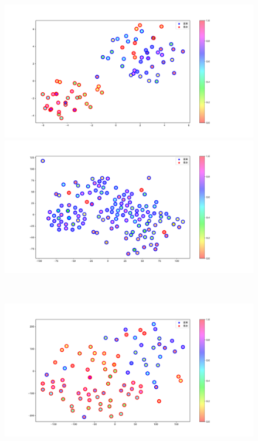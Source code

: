\begin{figure}[h]
 \begin{minipage}[b]{0.48\linewidth}
  \centering
  \includegraphics[scale=0.15]{./imgs/tSNE/cake_7.pdf}
 \end{minipage}
 \begin{minipage}[b]{0.48\linewidth}
  \centering
  \includegraphics[scale=0.15]{./imgs/tSNE/cake_8.pdf}
 \end{minipage}\\
 \begin{minipage}[b]{0.48\linewidth}
  \centering
  \includegraphics[scale=0.15]{./imgs/tSNE/cake_9.pdf}

\end{minipage}
\end{figure}
